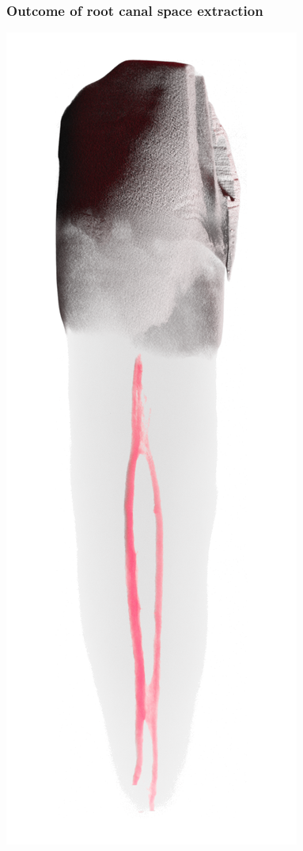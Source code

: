 \begin{frame}
	\frametitle{Outcome of root canal space extraction}%
	\renewcommand{\imheight}{0.618\paperheight}%
		\includegraphics[height=\imheight]{./images/rcs/Tooth0452}%

\end{frame}
